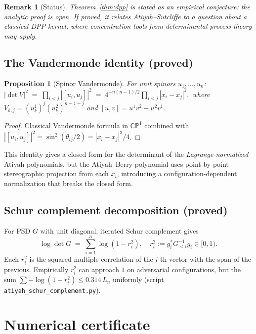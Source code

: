 \documentclass[11pt,a4paper]{article}
\newtheorem{proposition}[theorem]{Proposition}
\newtheorem{remark}[theorem]{Remark}
\begin{document}
\begin{remark}[Status]
Theorem~\ref{thm:dpp} is stated as an \emph{empirical conjecture}: the analytic
proof is open. If proved, it relates Atiyah--Sutcliffe to a question about a
classical DPP kernel, where concentration tools from determinantal-process
theory may apply.
\end{remark}

\subsection{The Vandermonde identity (proved)}

\begin{proposition}[Spinor Vandermonde]\label{prop:vandermonde}
For unit spinors $u_1, \ldots, u_n$:
$
|\det V|^2 \;=\; \prod_{i<j} |[u_i, u_j]|^2 \;=\; 4^{-n(n-1)/2} \prod_{i<j} |x_i - x_j|^2,
$
where $V_{k,j} = (u_k^1)^j (u_k^2)^{n-1-j}$ and $[u, v] = u^1 v^2 - u^2 v^1$.
\end{proposition}
\begin{proof}
Classical Vandermonde formula in $\mathbb{CP}^1$ combined with
$|[u_i, u_j]|^2 = \sin^2(\theta_{ij}/2) = |x_i - x_j|^2/4$.
\end{proof}

This identity gives a closed form for the determinant of the
\emph{Lagrange-normalized} Atiyah polynomials, but the Atiyah--Berry
polynomial uses point-by-point stereographic projection from each $x_i$,
introducing a configuration-dependent normalization that breaks the closed
form.

\subsection{Schur complement decomposition (proved)}
For PSD $G$ with unit diagonal, iterated Schur complement gives
\[
\log \det G \;=\; \sum_{i=1}^n \log(1 - r_i^2),
\quad r_i^2 := g_i^* G_{<i}^{-1} g_i \in [0, 1).
\]
Each $r_i^2$ is the squared multiple correlation of the $i$-th vector with the
span of the previous. Empirically $r_i^2$ can approach $1$ on adversarial
configurations, but the sum $\sum -\log(1 - r_i^2) \le 0.314\,L_n$ uniformly
(script \verb|atiyah_schur_complement.py|).

\section{Numerical certificate}\label{sec:numerical}
\end{document}
